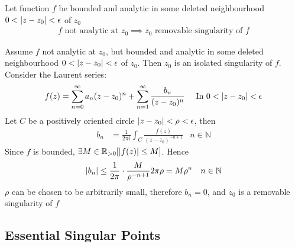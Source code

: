 \documentclass[12pt, english]{book}
\makeatletter
\renewenvironment{proof}[1][\proofname]{\par
	\pushQED{\qed}%
	\normalfont \topsep6\p@\@plus6\p@\relax
	\list{}{%
		\settowidth{\leftmargin}{\itshape\proofname:\hskip\labelsep}%
		\setlength{\labelwidth}{0pt}%
		\setlength{\itemindent}{-\leftmargin}%
	}%
	\item[\hskip\labelsep\itshape#1\@addpunct{:}]\ignorespaces
	}{ \popQED\endlist\@endpefalse}
\makeatother
\begin{document}
	\begin{theorem}
		\label{Riemann's Theorem - Complex}
		Let function \(f\) be bounded and analytic in some deleted neighbourhood \(0 < \abs{z-z_0}<\epsilon\) of \(z_0\)
		\begin{align*}
			f \text{ not analytic at }z_0 \implies z_0 \text{ removable singularity of } f
		\end{align*}
	\end{theorem}
	\begin{proof}
		Assume \(f\) not analytic at \(z_0\), but bounded and analytic in some deleted neighbourhood \(0 < \abs{z-z_0}<\epsilon\) of \(z_0\). Then \(z_0\) is an isolated singularity of \(f\). Consider the Laurent series:
		\begin{align*}
			f(z) &= \sum_{n=0}^{\infty} a_n (z-z_0)^n + \sum_{n=1}^{\infty} \frac{b_n}{(z-z_0)^n}
			& \text{ In } 0<\abs{z-z_0}<\epsilon
		\end{align*}
		Let \(C\) be a positively oriented circle \(\abs{z-z_0}<\rho<\epsilon\), then
		\begin{align*}
			b_n &= \frac{1}{2\pi i} \int_{C} \frac{f(z)}{(z-z_0)^{-n+1}}
				& n \in \mathbb{N}
		\end{align*}
		Since \(f\) is bounded, \(\exists M \in \mathbb{R}_{>0} [ \abs{f(z)}\leq M]\). Hence
		\begin{align*}
			\abs{b_n} &\leq \frac{1}{2\pi} \cdot \frac{M}{\rho^{-n+1}} 2 \pi \rho = M\rho^n 
				& n \in \mathbb{N}
		\end{align*}
		\(\rho\) can be chosen to be arbitrarily small, therefore \(b_n = 0\), and \(z_0\) is a removable singularity of \(f\)
	\end{proof}

	
	\subsection{Essential Singular Points}
	
\end{document}
